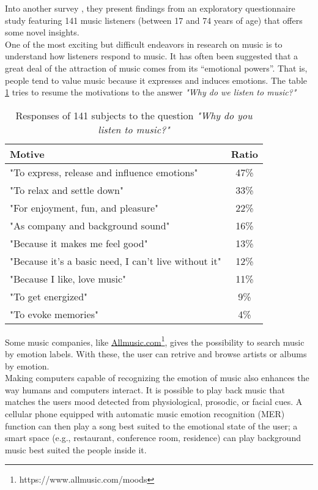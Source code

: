 Into another survey \cite{juslin2004expression}, they present findings from an exploratory questionnaire study featuring 141 music listeners (between 17 and 74 years of age) that offers some novel insights.
\\ 
One of the most exciting but difficult endeavors in research on music is to understand how listeners respond to music. It has often been suggested that a great deal of the attraction of music comes from its “emotional powers”. That is, people tend to value music because it expresses and induces emotions.
The table  \ref{table:motivation_music} tries to resume the motivations to the answer \textit{"Why do we listen to music?"}
\begin{table}[h!]
	\centering
	\begin{tabular}{|l | c|}
		\hline
		Motive & Ratio\\ [0.5ex] 
		\hline\hline "To express, release and influence emotions"	&	47\%	\\ 
		\hline "To relax and settle down"										&	33\%	\\
		\hline "For enjoyment, fun, and pleasure"							&	22\%	\\
		\hline "As company and background sound"						&	16\%	\\
		\hline "Because it makes me feel good"								&	13\%	\\
		\hline "Because it's a basic need, I can't live without it"		&	12\%	\\
		\hline "Because I like, love music"										&	11\%	\\
		\hline "To get energized"													&	9\%	\\
		\hline "To evoke memories"												&	4\%	\\ 
		\hline
	\end{tabular}
	\caption{Responses of 141 subjects to the question \textit{"Why do you listen to music?"}}
	\label{table:motivation_music}
\end{table}

\indent
Some music companies, like  \href{https://www.allmusic.com/moods}{Allmusic.com}\footnote{https://www.allmusic.com/moods}, gives the possibility to search music by emotion labels. With these, the user can retrive and browse artists or albums by emotion.
\\ \indent
Making computers capable of recognizing the emotion of music also enhances the way humans and computers interact. It is possible to play back music that matches the users mood detected from physiological, prosodic, or facial cues. A cellular phone equipped with automatic music emotion recognition (MER) function can then play a song best suited to the emotional state of the user; a smart space (e.g., restaurant, conference room, residence) can play background music best suited the people inside it.

